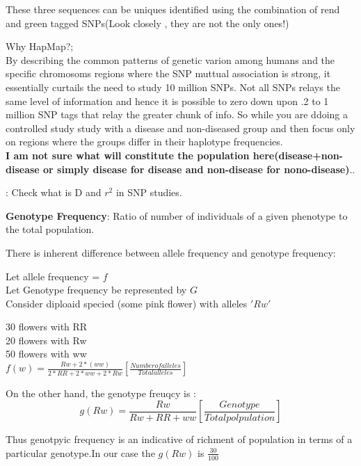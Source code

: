\documentclass[a4paper]{article}
\begin{document}
These three sequences can be uniques identified using the combination of rend and green tagged SNPs(Look closely , they are not the only ones!)

Why HapMap?;\\
By describing the common patterns of genetic varion among humans and the specific chromosoms regions where the SNP muttual association is strong, it essentially curtails the need to study 10 million SNPs. Not all SNPs relays the same level of information and hence it is possible to zero down upon .2 to 1 million SNP tags that relay the greater chunk of info. So while you are ddoing a controlled study study with a disease and non-diseased group  and then focus only on regions where the groups differ in their haplotype frequencies. \\
{\color{blue}\textbf{I am not sure what will constitute the population here(disease+non-disease or simply disease for disease and non-disease for nono-disease)}}..

{\color{red}{TODO}: Check what is D and $r^2$ in SNP studies.}

\textbf{Genotype Frequency}: Ratio of number of individuals of a given phenotype to the total population.

There is inherent difference between allele frequency and genotype frequency:

Let  allele frequency = $f$ \\
Let Genotype frequency be represented by $G$ \\

Consider diploaid specied (some pink flower) with alleles $'Rw'$

30 flowers with RR\\
20 flowers with Rw\\
50 flowers with ww\\

\begin{math}
f(w) = \frac{Rw+2*(ww)}{2*RR+2*ww+2*Rw} [\frac{Number of  alleles}{Total alleles}]
\end{math}

On the other hand, the genotype freuqcy is :\\
\begin{equation}
g(Rw)=\frac{Rw}{Rw+RR+ww}[\frac{Genotype}{Total polpulation}]
\end{equation}

Thus genotpyic frequency is an indicative of richment of population in terms of a particular genotype.In our case
the $g(Rw)$ is $\frac{30}{100}$
\end{document}
